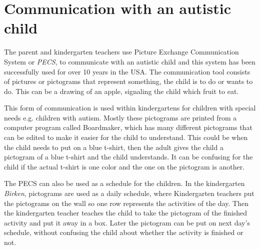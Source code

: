 \section{Communication with an autistic child}
The parent and kindergarten teachers use Picture Exchange Communication System or \textit{PECS}, to communicate with an autistic child and this system has been successfully used for over 10 years in the USA. The communication tool consists of pictures or pictograms that represent something, the child is to do or wants to do. This can be a drawing of an apple, signaling the child which fruit to eat. 

This form of communication is used within kindergartens for children with special needs e.g. children with autism. Mostly these pictograms are printed from a computer program called Boardmaker, which has many different pictograms that can be edited to make it easier for the child to understand. This could be when the child needs to put on a blue t-shirt, then the adult gives the child a pictogram of a blue t-shirt and the child understands. It can be confusing for the child if the actual t-shirt is one color and the one on the pictogram is another.

The PECS can also be used as a schedule for the children. In the kindergarten \textit{Birken}, pictograms are used as a daily schedule, where Kindergarten teachers put the pictograms on the wall so one row represents the activities of the day. Then the kindergarten teacher teaches the child to take the pictogram of the finished activity and put it away in a box. Later the pictogram can be put on next day's schedule, without confusing the child about whether the activity is finished or not.
